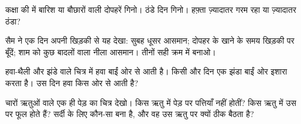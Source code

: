 \begin{exercise}[$\star\star$]\label{exo:g1:watching-the-weather:8}
कक्षा की  में बारिश या बौछारों वाली दोपहरें गिनो। ठंडे दिन
गिनो। हफ़्ता ज़्यादातर गरम रहा या ज़्यादातर ठंडा?
\end{exercise}

\begin{exercise}[$\star\star$]\label{exo:g1:watching-the-weather:9}
सैम ने एक दिन अपनी खिड़की से यह देखा: सुबह धूसर आसमान; दोपहर के खाने
के समय खिड़की पर बूँदें; शाम को कुछ बादलों वाला नीला आसमान। तीनों
 सही क्रम में बनाओ।
\end{exercise}

\begin{exercise}[$\star\star$]\label{exo:g1:watching-the-weather:10}
हवा-थैली और झंडे वाले चित्र में हवा बाईं ओर से आती है। किसी और दिन एक झंडा
बाईं ओर इशारा करता है। उस दिन हवा किस ओर से आती है?
\end{exercise}

\begin{exercise}[$\star\star$]\label{exo:g1:watching-the-weather:11}
चारों ऋतुओं वाले एक ही पेड़ का चित्र देखो। किस ऋतु में पेड़ पर पत्तियाँ
नहीं होतीं? किस ऋतु में उस पर फूल होते हैं? सर्दी के लिए कौन-सा
 बना है, और वह उस ऋतु पर क्यों ठीक बैठता है?
\end{exercise}
